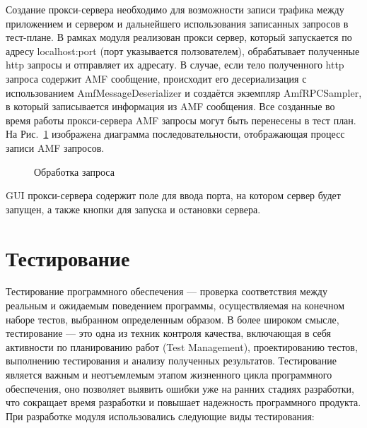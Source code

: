 Создание прокси-сервера необходимо для возможности записи трафика между приложением и сервером и дальнейшего использования 
записанных запросов в тест-плане. В рамках модуля реализован прокси сервер, который запускается по адресу 
localhost:port (порт указывается ползователем), обрабатывает полученные http запросы и отправляет их адресату. 
В случае, если тело полученного http запроса содержит AMF сообщение, происходит его десериализация с использованием 
AmfMessageDeserializer и создаётся экземпляр 
AmfRPCSampler, в который записывается информация из AMF сообщения. Все созданные во время работы прокси-сервера AMF запросы 
могут быть перенесены в тест план. На Рис.~\ref{ris:Diagram1.png} изображена диаграмма последовательности, отображающая
процесс записи AMF запросов.

\begin{figure}[ht]
\caption{Обработка запроса}
\label{ris:Diagram1.png}
\end{figure}

GUI прокси-сервера содержит поле для ввода порта, на котором сервер будет запущен, а также кнопки для запуска и остановки 
сервера.

\section{Тестирование}

Тестирование программного обеспечения --- проверка соответствия между реальным и ожидаемым поведением программы,
осуществляемая на конечном наборе тестов, выбранном определенным образом\cite{swebok}.
В более широком смысле, тестирование --- это одна из техник контроля качества, включающая в себя активности по
планированию работ (Test Management), проектированию тестов, выполнению тестирования и анализу полученных результатов.
Тестирование является важным и неотъемлемым этапом жизненного цикла программного обеспечения, оно позволяет выявить
ошибки уже на ранних стадиях разработки, что сокращает время разработки и повышает надежность программного продукта.
При разработке модуля использовались следующие виды тестирования:

